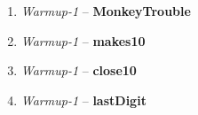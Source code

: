 \begin{exer}
\begin{enumerate}

\item \textit{Warmup-1} -- \textbf{MonkeyTrouble}
\evallinefive

\item \textit{Warmup-1} -- \textbf{makes10}
\evallinefive

\item \textit{Warmup-1} -- \textbf{close10}
\evallinefive

\item \textit{Warmup-1} -- \textbf{lastDigit}
\evallinefive

\end{enumerate}
\end{exer}

\initialbox

